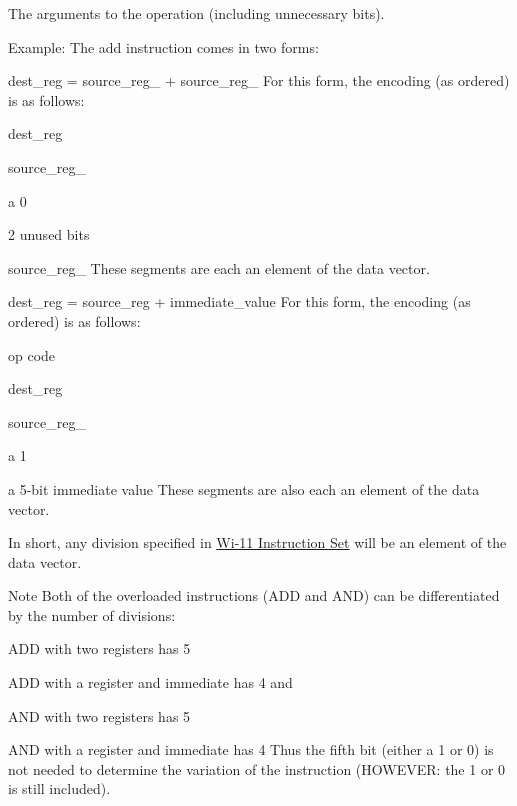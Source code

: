 The arguments to the operation (including unnecessary bits). 

\begin{DoxyParagraph}{Example:}
The add instruction comes in two forms: 
\end{DoxyParagraph}
\begin{DoxyParagraph}{}
\begin{DoxyItemize}
\item dest\_\-reg = source\_\-reg\_ + source\_\-reg\_ For this form, the encoding (as ordered) is as follows: 
\begin{DoxyItemize}
\item dest\_\-reg 
\item source\_\-reg\_ 
\item a 0 
\item 2 unused bits 
\item source\_\-reg\_ These segments are each an element of the data vector. 
\end{DoxyItemize}\end{DoxyItemize}

\end{DoxyParagraph}
\begin{DoxyParagraph}{}
\begin{DoxyItemize}
\item dest\_\-reg = source\_\-reg + immediate\_\-value For this form, the encoding (as ordered) is as follows: 
\begin{DoxyItemize}
\item op code 
\item dest\_\-reg 
\item source\_\-reg\_ 
\item a 1 
\item a 5-\/bit immediate value These segments are also each an element of the data vector. 
\end{DoxyItemize}In short, any division specified in \hyperlink{index_instructions}{Wi-\/11 Instruction Set} will be an element of the data vector.\end{DoxyItemize}

\end{DoxyParagraph}
\begin{DoxyNote}{Note}
Both of the overloaded instructions (ADD and AND) can be differentiated by the number of divisions: \begin{DoxyItemize}
\item ADD with two registers has 5 \item ADD with a register and immediate has 4 and \item AND with two registers has 5 \item AND with a register and immediate has 4 Thus the fifth bit (either a 1 or 0) is not needed to determine the variation of the instruction (HOWEVER: the 1 or 0 is still included). \end{DoxyItemize}

\end{DoxyNote}
